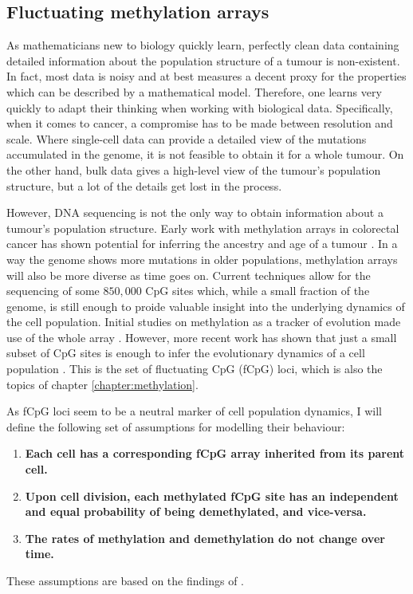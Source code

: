 \subsection{Fluctuating methylation arrays}
As mathematicians new to biology quickly learn, perfectly clean data containing
detailed information about the population structure of a tumour is
non-existent. In fact, most data is noisy and at best measures a decent proxy
for the properties which can be described by a mathematical model. Therefore,
one learns very quickly to adapt their thinking when working with biological
data. Specifically, when it comes to cancer, a compromise has to be made
between resolution and scale. Where single-cell data can provide a detailed
view of the mutations accumulated in the genome, it is not feasible to obtain
it for a whole tumour. On the other hand, bulk data gives a high-level view of
the tumour's population structure, but a lot of the details get lost in the
process. \par
However, DNA sequencing is not the only way to obtain information about a
tumour's population structure. Early work with methylation arrays in colorectal
cancer has shown potential for inferring the ancestry and age of a tumour
\cite{hong_using_2010, siegmund_high_2011}. In a way the genome shows more
mutations in older populations, methylation arrays will also be more diverse as
time goes on. Current techniques allow for the sequencing of some $850,000$ CpG
sites which, while a small fraction of the genome, is still enough to proide
valuable insight into the underlying dynamics of the cell population. Initial
studies on methylation as a tracker of evolution made use of the whole array
\cite{siegmund_modeling_2008, sottoriva_integrating_2010}. However, more recent
work has shown that just a small subset of CpG sites is enough to infer the
evolutionary dynamics of a cell population \cite{gabbutt_fluctuating_2022,
gabbutt_evolutionary_2023}. This is the set of fluctuating CpG (fCpG) loci,
which is also the topics of chapter \ref{chapter:methylation}. \par
As fCpG loci seem to be a neutral marker of cell population dynamics, I will
define the following set of assumptions for modelling their behaviour:
\begin{enumerate}[(i')]
    \item \textbf{Each cell has a corresponding fCpG array inherited from its
        parent cell.}
    \item \textbf{Upon cell division, each methylated fCpG site has an
        independent and equal probability of being demethylated, and
        vice-versa.}
    \item \textbf{The rates of methylation and demethylation do not change over
        time.}
\end{enumerate}
These assumptions are based on the findings of \cite{gabbutt_fluctuating_2022,
gabbutt_evolutionary_2023}.

